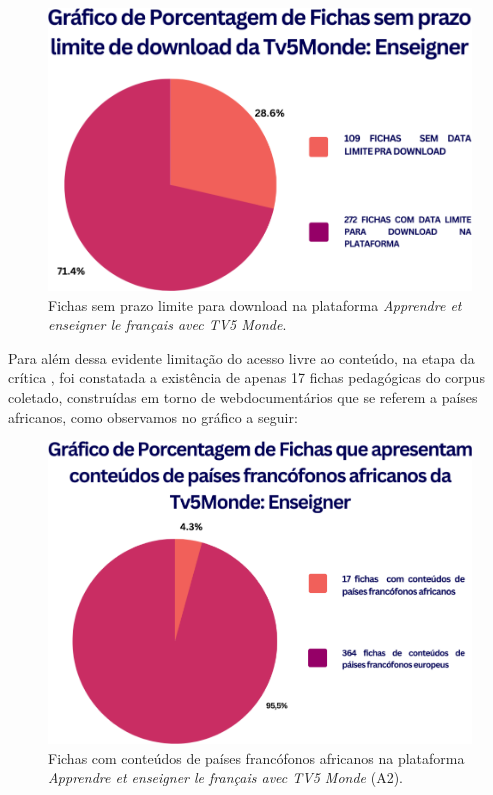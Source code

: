 \documentclass[portuguese]{textolivre}
\begin{document}
\begin{figure}
    \centering
    \begin{minipage}{.75\textwidth}
    \includegraphics[width=\linewidth]{Fig4.png}
    \caption{Fichas sem prazo limite para download na plataforma \textit{Apprendre et enseigner le français avec TV5 Monde}.}
    \label{fig4}
    \end{minipage}
\end{figure}

Para além dessa evidente limitação do acesso livre ao conteúdo, na etapa da crítica \cite{deschaine_five_2015}, foi constatada a existência de apenas 17 fichas pedagógicas do corpus coletado, construídas em torno de webdocumentários que se referem a países africanos, como observamos no gráfico a seguir:

\begin{figure}
    \centering
    \begin{minipage}{.75\textwidth}
    \includegraphics[width=\linewidth]{Fig5.png}
    \caption{Fichas com conteúdos de países francófonos africanos na plataforma \textit{Apprendre et enseigner le français avec TV5 Monde} (A2).}
    \label{fig5}
    \end{minipage}
\end{figure}
\end{document}

